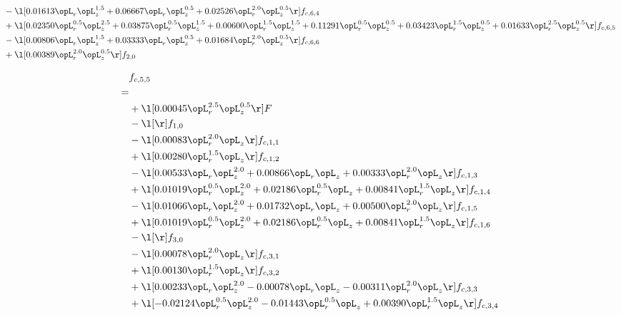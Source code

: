 \begin{alignat}{2}
& - \l[  0.01613 \opL_r \opL_z^{1.5} +  0.06667 \opL_r \opL_z^{0.5} +  0.02526 \opL_r^{2.0} \opL_z^{0.5}  \r] f_{c,6,4} \nonumber \\ 
& + \l[  0.02350 \opL_r^{0.5} \opL_z^{2.5} +  0.03875 \opL_r^{0.5} \opL_z^{1.5} +  0.00600 \opL_r^{1.5} \opL_z^{1.5} +  0.11291 \opL_r^{0.5} \opL_z^{0.5} +  0.03423 \opL_r^{1.5} \opL_z^{0.5} +  0.01633 \opL_r^{2.5} \opL_z^{0.5}  \r] f_{c,6,5} \nonumber \\ 
& - \l[  0.00806 \opL_r \opL_z^{1.5} +  0.03333 \opL_r \opL_z^{0.5} +  0.01684 \opL_r^{2.0} \opL_z^{0.5}  \r] f_{c,6,6} \nonumber \\ 
& + \l[  0.00389 \opL_r^{2.0} \opL_z^{0.5}  \r] f_{2,0} \nonumber \\ 
\end{alignat} 


\begin{alignat}{2} 
\label{eq:f_55_1} 
& f_{c,5,5} \nonumber \\ 
 = \\ 
& + \l[  0.00045 \opL_r^{2.5} \opL_z^{0.5}  \r] F \nonumber \\ 
& - \l[  \r] f_{1,0} \nonumber \\ 
& - \l[  0.00083 \opL_r^{2.0} \opL_z  \r] f_{c,1,1} \nonumber \\ 
& + \l[  0.00280 \opL_r^{1.5} \opL_z  \r] f_{c,1,2} \nonumber \\ 
& - \l[  0.00533 \opL_r \opL_z^{2.0} +  0.00866 \opL_r \opL_z +  0.00333 \opL_r^{2.0} \opL_z  \r] f_{c,1,3} \nonumber \\ 
& + \l[  0.01019 \opL_r^{0.5} \opL_z^{2.0} +  0.02186 \opL_r^{0.5} \opL_z +  0.00841 \opL_r^{1.5} \opL_z  \r] f_{c,1,4} \nonumber \\ 
& - \l[  0.01066 \opL_r \opL_z^{2.0} +  0.01732 \opL_r \opL_z +  0.00500 \opL_r^{2.0} \opL_z  \r] f_{c,1,5} \nonumber \\ 
& + \l[  0.01019 \opL_r^{0.5} \opL_z^{2.0} +  0.02186 \opL_r^{0.5} \opL_z +  0.00841 \opL_r^{1.5} \opL_z  \r] f_{c,1,6} \nonumber \\ 
& - \l[  \r] f_{3,0} \nonumber \\ 
& - \l[  0.00078 \opL_r^{2.0} \opL_z  \r] f_{c,3,1} \nonumber \\ 
& + \l[  0.00130 \opL_r^{1.5} \opL_z  \r] f_{c,3,2} \nonumber \\ 
& + \l[  0.00233 \opL_r \opL_z^{2.0}   -0.00078 \opL_r \opL_z   -0.00311 \opL_r^{2.0} \opL_z  \r] f_{c,3,3} \nonumber \\ 
& + \l[  -0.02124 \opL_r^{0.5} \opL_z^{2.0}   -0.01443 \opL_r^{0.5} \opL_z +  0.00390 \opL_r^{1.5} \opL_z  \r] f_{c,3,4} \nonumber \\ 

\end{alignat}

